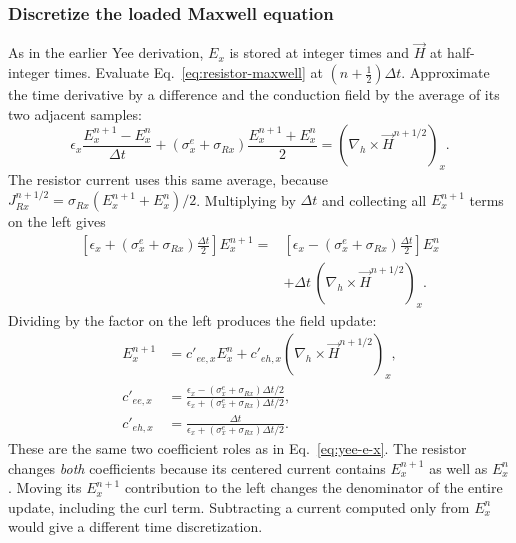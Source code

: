 \documentclass[10pt]{article}
\begin{document}
\subsubsection{Discretize the loaded Maxwell equation}
As in the earlier Yee derivation, $E_x$ is stored at integer times and
$\vec H$ at half-integer times. Evaluate Eq.~\eqref{eq:resistor-maxwell}
at $(n+\tfrac12)\Delta t$. Approximate the time derivative by a difference
and the conduction field by the average of its two adjacent samples:
\begin{equation}
    \epsilon_x\frac{E_x^{n+1}-E_x^n}{\Delta t}
    +(\sigma_x^e+\sigma_{Rx})\frac{E_x^{n+1}+E_x^n}{2}
    =(\nabla_h\times\vec H^{n+1/2})_x.
    \label{eq:resistor-discrete}
\end{equation}
The resistor current uses this same average, because
$J_{Rx}^{n+1/2}=\sigma_{Rx}(E_x^{n+1}+E_x^n)/2$.
Multiplying by $\Delta t$ and collecting all $E_x^{n+1}$ terms on the left
gives
\begin{equation}
    \begin{aligned}
    \left[\epsilon_x+(\sigma_x^e+\sigma_{Rx})\frac{\Delta t}{2}\right]
        E_x^{n+1}
    ={}&\left[\epsilon_x-(\sigma_x^e+\sigma_{Rx})\frac{\Delta t}{2}\right]
        E_x^n\\
    &+\Delta t\,(\nabla_h\times\vec H^{n+1/2})_x.
    \end{aligned}
\end{equation}
Dividing by the factor on the left produces the field update:
\begin{equation}
    \boxed{\begin{aligned}
    E_x^{n+1}&=c'_{ee,x}E_x^n
        +c'_{eh,x}(\nabla_h\times\vec H^{n+1/2})_x,\\[2pt]
    c'_{ee,x}&=
        \frac{\epsilon_x-(\sigma_x^e+\sigma_{Rx})\Delta t/2}
             {\epsilon_x+(\sigma_x^e+\sigma_{Rx})\Delta t/2},\\[2pt]
    c'_{eh,x}&=
        \frac{\Delta t}{\epsilon_x+(\sigma_x^e+\sigma_{Rx})\Delta t/2}.
    \end{aligned}}
    \label{eq:resistor-field}
\end{equation}
These are the same two coefficient roles as in Eq.~\eqref{eq:yee-e-x}.
The resistor changes \emph{both} coefficients because its centered current
contains $E_x^{n+1}$ as well as $E_x^n$. Moving its $E_x^{n+1}$ contribution
to the left changes the denominator of the entire update, including the
curl term. Subtracting a current computed only from $E_x^n$ would give a
different time discretization.
\end{document}
